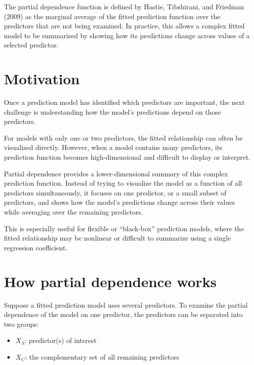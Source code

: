 \documentclass[
  letterpaper,
  DIV=11,
  numbers=noendperiod]{scrreprt}
\providecommand{\tightlist}{%
  \setlength{\itemsep}{0pt}\setlength{\parskip}{0pt}}
\begin{document}
The partial dependence function is defined by Hastie, Tibshirani, and
Friedman (2009) as the marginal average of the fitted prediction
function over the predictors that are not being examined. In practice,
this allows a complex fitted model to be summarized by showing how its
predictions change across values of a selected predictor.

\section{Motivation}\label{motivation}

Once a prediction model has identified which predictors are important,
the next challenge is understanding how the model's predictions depend
on those predictors.

For models with only one or two predictors, the fitted relationship can
often be visualized directly. However, when a model contains many
predictors, its prediction function becomes high-dimensional and
difficult to display or interpret.

Partial dependence provides a lower-dimensional summary of this complex
prediction function. Instead of trying to visualize the model as a
function of all predictors simultaneously, it focuses on one predictor,
or a small subset of predictors, and shows how the model's predictions
change across their values while averaging over the remaining
predictors.

This is especially useful for flexible or ``black-box'' prediction
models, where the fitted relationship may be nonlinear or difficult to
summarize using a single regression coefficient.

\section{How partial dependence
works}\label{how-partial-dependence-works}

Suppose a fitted prediction model uses several predictors. To examine
the partial dependence of the model on one predictor, the predictors can
be separated into two groups:

\begin{itemize}
\tightlist
\item
  \(X_S\): predictor(s) of interest\\
\item
  \(X_C\): the complementary set of all remaining predictors
\end{itemize}
\end{document}
